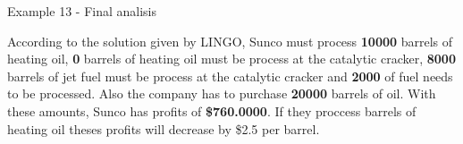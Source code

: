 \begin{frame}{Example 13 - Final analisis}

According to the solution given by LINGO, Sunco must process \textbf{10000}
barrels of heating oil, \textbf{0} barrels of heating oil must be process at the
catalytic cracker, \textbf{8000} barrels of jet fuel must be process at the
catalytic cracker and \textbf{2000} of fuel needs to be processed.
Also the company has to purchase \textbf{20000} barrels of oil. With these
amounts, Sunco has profits of \textbf{\$760.0000}. If they proccess barrels of
heating oil theses profits will decrease by \$2.5 per barrel.

\end{frame}
